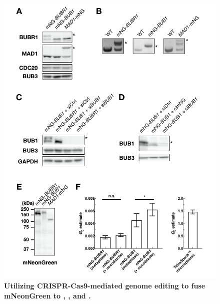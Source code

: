 \begin{figure}
    \centering
    \includegraphics[width=\textwidth]{chapters/figures/CRISPRValidation.pdf}
    \caption{\textbf{Utilizing CRISPR-Cas9-mediated genome editing to fuse mNeonGreen to , , and  .}}
    \label{CRISPRValidation}
\end{figure}

